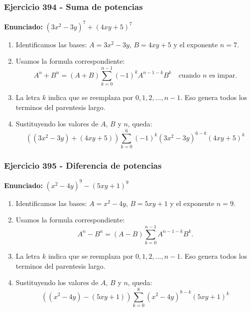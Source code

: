 \documentclass[11pt,a4paper]{article}
\begin{document}
\subsubsection*{Ejercicio 394 - Suma de potencias}
\textbf{Enunciado:} $ \left(3 x^{2} - 3 y\right)^{7}+\left(4 x y + 5\right)^{7} $\par
\begin{enumerate}[leftmargin=2em]
\item Identificamos las bases: \(A=3 x^{2} - 3 y\), \(B=4 x y + 5\) y el exponente \(n=7\).
\item Usamos la formula correspondiente: \[A^n+B^n=(A+B)\sum_{k=0}^{n-1}(-1)^kA^{n-1-k}B^k\quad\text{cuando }n\text{ es impar}.\]
\item La letra \(k\) indica que se reemplaza por \(0,1,2,\ldots,n-1\). Eso genera todos los terminos del parentesis largo.
\item Sustituyendo los valores de \(A\), \(B\) y \(n\), queda: \[\boxed{\left(\left(3 x^{2} - 3 y\right)+\left(4 x y + 5\right)\right)\sum_{k=0}^{6}(-1)^k\left(3 x^{2} - 3 y\right)^{6-k}\left(4 x y + 5\right)^k}\]
\end{enumerate}

\vspace{0.2cm}
\subsubsection*{Ejercicio 395 - Diferencia de potencias}
\textbf{Enunciado:} $ \left(x^{2} - 4 y\right)^{9}-\left(5 x y + 1\right)^{9} $\par
\begin{enumerate}[leftmargin=2em]
\item Identificamos las bases: \(A=x^{2} - 4 y\), \(B=5 x y + 1\) y el exponente \(n=9\).
\item Usamos la formula correspondiente: \[A^n-B^n=(A-B)\sum_{k=0}^{n-1}A^{n-1-k}B^k.\]
\item La letra \(k\) indica que se reemplaza por \(0,1,2,\ldots,n-1\). Eso genera todos los terminos del parentesis largo.
\item Sustituyendo los valores de \(A\), \(B\) y \(n\), queda: \[\boxed{\left(\left(x^{2} - 4 y\right)-\left(5 x y + 1\right)\right)\sum_{k=0}^{8}\left(x^{2} - 4 y\right)^{8-k}\left(5 x y + 1\right)^k}\]
\end{enumerate}

\vspace{0.2cm}
\end{document}
